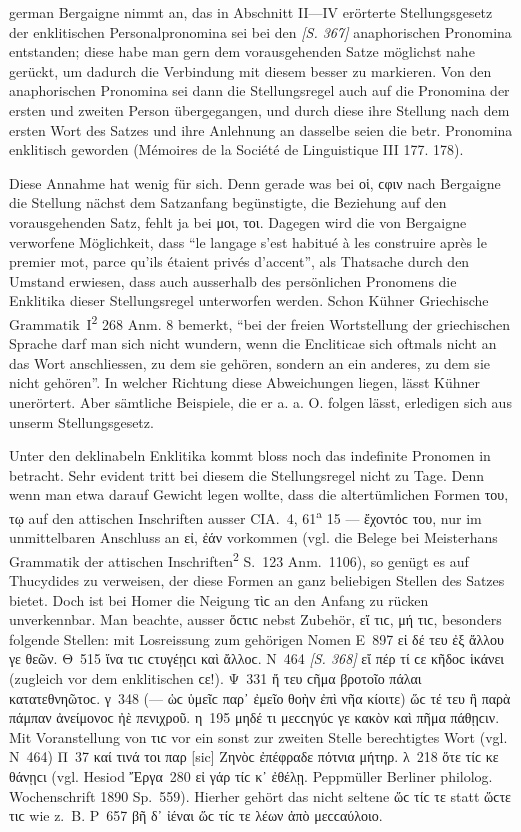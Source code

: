 \begin{otherlanguage*}{german}
Bergaigne nimmt an, das in Abschnitt II—IV erörterte Stellungsgesetz der enklitischen Personalpronomina sei bei den \hypertarget{p367}{\emph{[S. 367]}}\label{p367} anaphorischen Pronomina entstanden; diese habe man gern dem vorausgehenden Satze möglichst nahe gerückt, um dadurch die Verbindung mit diesem besser zu markieren. Von den anaphorischen Pronomina sei dann die Stellungsregel auch auf die Pronomina der ersten und zweiten Person übergegangen, und durch diese ihre Stellung nach dem ersten Wort des Satzes und ihre Anlehnung an dasselbe seien die betr. Pronomina enklitisch geworden (Mémoires de la Société de Linguistique III 177. 178).

Diese Annahme hat wenig für sich. Denn gerade was bei οἱ, ϲφιν nach Bergaigne die Stellung nächst dem Satzanfang begünstigte, die Beziehung auf den vorausgehenden Satz, fehlt ja bei μοι, τοι. Dagegen wird die von Bergaigne verworfene Möglichkeit, dass “le langage s’est habitué à les construire après le premier mot, parce qu’ils étaient privés d’accent”, als Thatsache durch den Umstand erwiesen, dass auch ausserhalb des persönlichen Pronomens die Enklitika dieser Stellungsregel unterworfen werden. Schon Kühner Griechische Grammatik~I\textsuperscript{2} 268 Anm. 8 bemerkt, “bei der freien Wortstellung der griechischen Sprache darf man sich nicht wundern, wenn die Encliticae sich oftmals nicht an das Wort anschliessen, zu dem sie gehören, sondern an ein anderes, zu dem sie nicht gehören”. In welcher Richtung diese Abweichungen liegen, lässt Kühner unerörtert. Aber sämtliche Beispiele, die er a. a. O. folgen lässt, erledigen sich aus unserm Stellungsgesetz.

Unter den deklinabeln Enklitika kommt bloss noch das indefinite Pronomen in betracht. Sehr evident tritt bei diesem die Stellungsregel nicht zu Tage. Denn wenn man etwa darauf Gewicht legen wollte, dass die altertümlichen Formen του, τῳ auf den attischen Inschriften ausser CIA.~4, 61\textsuperscript{a} 15 — ἔχοντόϲ του, nur im unmittelbaren Anschluss an εἰ, ἐάν vorkommen (vgl. die Belege bei Meisterhans Grammatik der attischen Inschriften\textsuperscript{2} S.~123 Anm.~1106), so genügt es auf Thucydides zu verweisen, der diese Formen an ganz beliebigen Stellen des Satzes bietet. Doch ist bei Homer die Neigung τὶϲ an den Anfang zu rücken unverkennbar. Man beachte, ausser ὅϲτιϲ nebst Zubehör, εἴ τιϲ, μή τιϲ, besonders folgende Stellen: mit Losreissung zum gehörigen Nomen Ε~897 εἰ δέ τευ ἐξ ἄλλου γε θεῶν. Θ~515 ἵνα τιϲ ϲτυγέῃϲι καὶ ἄλλοϲ. Ν~464 \hypertarget{p368}{\emph{[S. 368]}}\label{p368} εἴ πέρ τί ϲε κῆδοϲ ἱκάνει (zugleich vor dem enklitischen ϲε!). Ψ~331 ἤ τευ ϲῆμα βροτοῖο πάλαι κατατεθνηῶτοϲ. γ~348 (— ὡϲ ὑμεῖϲ παρ᾽ ἐμεῖο θοὴν ἐπὶ νῆα κίοιτε) ὥϲ τέ τευ ἢ παρὰ πάμπαν ἀνείμονοϲ ἠὲ πενιχροῦ. η~195 μηδέ τι μεϲϲηγύϲ γε κακὸν καὶ πῆμα πάθῃϲιν. Mit Voranstellung von τιϲ vor ein sonst zur zweiten Stelle berechtigtes Wort (vgl. Ν~464) Π~37 καί τινά τοι παρ [sic] Ζηνὸϲ ἐπέφραδε πότνια μήτηρ. λ~218 ὅτε τίϲ κε θάνῃϲι (vgl. Hesiod Ἔργα~280 εἰ γάρ τίϲ κ᾽ ἐθέλῃ. Peppmüller Berliner philolog. Wochenschrift 1890 Sp.~559). Hierher gehört das nicht seltene ὥϲ τίϲ τε statt ὥϲτε τιϲ  wie z.~B. Ρ~657 βῆ δ᾽ ἰέναι ὥϲ τίϲ τε λέων ἀπὸ μεϲϲαύλοιο.


\end{otherlanguage*}
